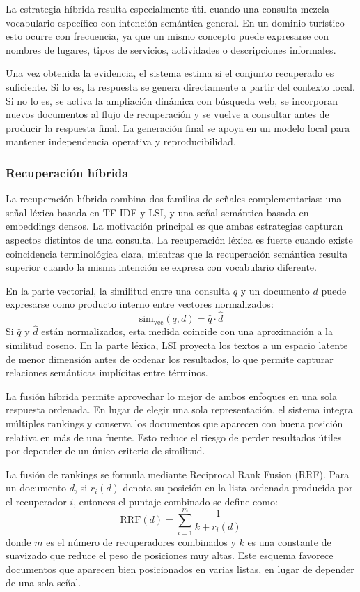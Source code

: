 \documentclass{llncs}
\begin{document}
La estrategia híbrida resulta especialmente útil cuando una consulta mezcla vocabulario específico con intención semántica general. En un dominio turístico esto ocurre con frecuencia, ya que un mismo concepto puede expresarse con nombres de lugares, tipos de servicios, actividades o descripciones informales.

Una vez obtenida la evidencia, el sistema estima si el conjunto recuperado es suficiente. Si lo es, la respuesta se genera directamente a partir del contexto local. Si no lo es, se activa la ampliación dinámica con búsqueda web, se incorporan nuevos documentos al flujo de recuperación y se vuelve a consultar antes de producir la respuesta final. La generación final se apoya en un modelo local para mantener independencia operativa y reproducibilidad.
\subsubsection{Recuperación híbrida}
La recuperación híbrida combina dos familias de señales complementarias: una señal léxica basada en TF-IDF y LSI, y una señal semántica basada en embeddings densos. La motivación principal es que ambas estrategias capturan aspectos distintos de una consulta. La recuperación léxica es fuerte cuando existe coincidencia terminológica clara, mientras que la recuperación semántica resulta superior cuando la misma intención se expresa con vocabulario diferente.

En la parte vectorial, la similitud entre una consulta $q$ y un documento $d$ puede expresarse como producto interno entre vectores normalizados:
\[
\text{sim}_{\text{vec}}(q,d) = \hat{q} \cdot \hat{d}
\]
Si $\hat{q}$ y $\hat{d}$ están normalizados, esta medida coincide con una aproximación a la similitud coseno. En la parte léxica, LSI proyecta los textos a un espacio latente de menor dimensión antes de ordenar los resultados, lo que permite capturar relaciones semánticas implícitas entre términos.

La fusión híbrida permite aprovechar lo mejor de ambos enfoques en una sola respuesta ordenada. En lugar de elegir una sola representación, el sistema integra múltiples rankings y conserva los documentos que aparecen con buena posición relativa en más de una fuente. Esto reduce el riesgo de perder resultados útiles por depender de un único criterio de similitud.

La fusión de rankings se formula mediante Reciprocal Rank Fusion (RRF). Para un documento $d$, si $r_i(d)$ denota su posición en la lista ordenada producida por el recuperador $i$, entonces el puntaje combinado se define como:
\[
\text{RRF}(d) = \sum_{i=1}^{m} \frac{1}{k + r_i(d)}
\]
donde $m$ es el número de recuperadores combinados y $k$ es una constante de suavizado que reduce el peso de posiciones muy altas. Este esquema favorece documentos que aparecen bien posicionados en varias listas, en lugar de depender de una sola señal.
\end{document}
